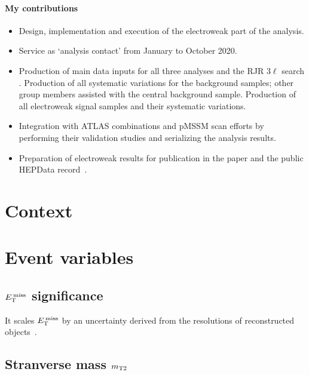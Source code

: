 \paragraph{My contributions}
\begin{itemize}
\item Design, implementation and execution of the electroweak part of the analysis.
\item Service as `analysis contact' from January to October 2020.
\item Production of main data inputs for all three analyses
and the RJR $3\ell$ search .
Production of all systematic variations for the background samples;
other group members assisted with the central background sample.
Production of all electroweak signal samples and their systematic variations.
\item Integration with ATLAS combinations and pMSSM scan efforts by
performing their validation studies and serializing the analysis results.
\item Preparation of electroweak results for publication in the paper  and the
public HEPData record~\cite{maguire2017hepdata}.
\end{itemize}

\clearpage
\FloatBarrier
\section{Context}


\section{Event variables}


\subsection{$E_\mathrm{T}^\mathrm{\:miss}$ significance}
\label{sec:metsig}
It scales $E_\mathrm{T}^\mathrm{\:miss}$ by an uncertainty derived from the resolutions of
reconstructed objects~\cite{atlas_met_significance}.

\subsection{Stranverse mass $m_\mathrm{T2}$}
\label{sec:mt2}


